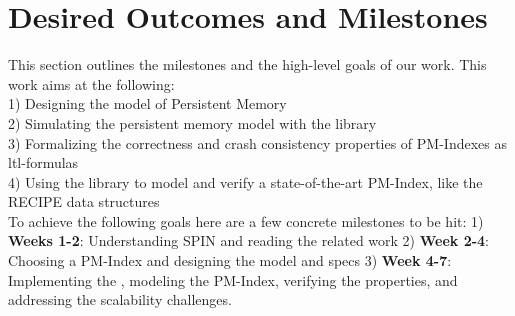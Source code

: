 \section{Desired Outcomes and Milestones}

This section outlines the milestones and the high-level goals of our work. This
work aims at the following: \\
1) Designing the model of Persistent Memory\\
2) Simulating the persistent memory model with the \checker library\\
3) Formalizing the correctness and crash consistency properties of PM-Indexes as
ltl-formulas\\
4) Using the \checker library to model and verify a state-of-the-art PM-Index,
like the RECIPE data structures~\cite{LeeEtAl19-Recipe}\\

To achieve the following goals here are a few concrete milestones to be hit:
1) \textbf{Weeks 1-2}: Understanding SPIN and reading the related work
2) \textbf{Week 2-4}: Choosing a PM-Index and designing the model and specs
3) \textbf{Week 4-7}: Implementing the \checker, modeling the PM-Index,
verifying the properties, and addressing the scalability challenges.
